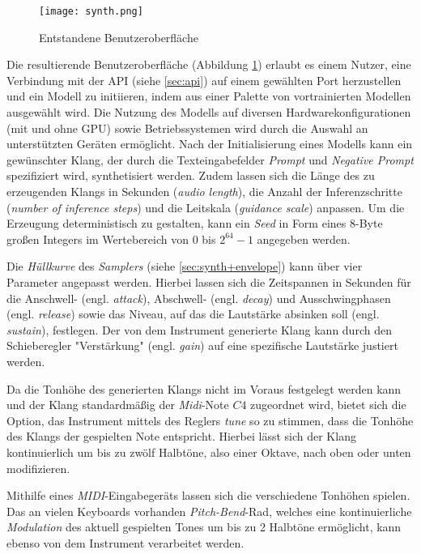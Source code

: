 \documentclass[
  a4paper,  %
  twoside,  %
  bibliography=totoc,
  headsepline,
  cleardoublepage=empty,
  parskip=half,
  draft=false
]{scrbook}
\begin{document}
\begin{figure}[h]
  \centering
  \texttt{[image: synth.png]}
  \caption[Benutzeroberfläche]{Entstandene Benutzeroberfläche}
  \label{fig:synth}
\end{figure} 

Die resultierende Benutzeroberfläche (Abbildung \ref{fig:synth}) erlaubt es einem Nutzer, eine Verbindung mit der API (siehe \ref{sec:api}) auf einem gewählten Port herzustellen und ein Modell zu initiieren, indem aus einer Palette von vortrainierten Modellen ausgewählt wird. Die Nutzung des Modells auf diversen Hardwarekonfigurationen (mit und ohne GPU) sowie Betriebssystemen wird durch die Auswahl an unterstützten Geräten ermöglicht. Nach der Initialisierung eines Modells kann ein gewünschter Klang, der durch die Texteingabefelder \emph{Prompt} und \emph{Negative Prompt} spezifiziert wird, synthetisiert werden. Zudem lassen sich die Länge des zu erzeugenden Klangs in Sekunden (\emph{audio length}), die Anzahl der Inferenzschritte (\emph{number of inference steps}) und die Leitskala (\emph{guidance scale}) anpassen. Um die Erzeugung deterministisch zu gestalten, kann ein \emph{Seed} in Form eines 8-Byte großen Integers im Wertebereich von $0$ bis $2^{64}-1$ angegeben werden.

Die \emph{Hüllkurve} des \emph{Samplers} (siehe \ref{sec:synth+envelope}) kann über vier Parameter angepasst werden. Hierbei lassen sich die Zeitspannen in Sekunden für die Anschwell- (engl. \emph{attack}), Abschwell- (engl. \emph{decay}) und Ausschwingphasen (engl. \emph{release}) sowie das Niveau, auf das die Lautstärke absinken soll (engl. \emph{sustain}), festlegen. Der von dem Instrument generierte Klang kann durch den Schieberegler "Verstärkung" (engl. \emph{gain}) auf eine spezifische Lautstärke justiert werden.

Da die Tonhöhe des generierten Klangs nicht im Voraus festgelegt werden kann und der Klang standardmäßig der \emph{Midi}-Note $C4$ zugeordnet wird, bietet sich die Option, das Instrument mittels des Reglers \emph{tune} so zu stimmen, dass die Tonhöhe des Klangs der gespielten Note entspricht. Hierbei lässt sich der Klang kontinuierlich um bis zu zwölf Halbtöne, also einer Oktave, nach oben oder unten modifizieren.

Mithilfe eines \emph{MIDI}-Eingabegeräts lassen sich die verschiedene Tonhöhen spielen. Das an vielen Keyboards vorhanden \emph{Pitch-Bend}-Rad, welches eine kontinuierliche \emph{Modulation} des aktuell gespielten Tones um bis zu 2 Halbtöne ermöglicht, kann ebenso von dem Instrument verarbeitet werden. 
\end{document}
